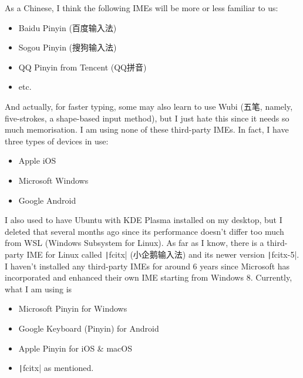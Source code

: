 \documentclass[12pt]{article}
\begin{document}
As a Chinese, I think the following IMEs will be more or less familiar to us:

\begin{itemize}
  \item Baidu Pinyin (百度输入法)
  \item Sogou Pinyin (搜狗输入法)
  \item QQ Pinyin from Tencent (QQ拼音)
  \item etc.
\end{itemize}

And actually, for faster typing, some may also learn to use Wubi (五笔, namely, five-strokes, a shape-based input method), but I just hate this since it needs so much memorisation. I am using none of these third-party IMEs. In fact, I have three types of devices in use:

\begin{itemize}
  \item Apple iOS
  \item Microsoft Windows
  \item Google Android
\end{itemize}

I also used to have Ubuntu with KDE Plasma installed on my desktop, but I deleted that several months ago since its performance doesn't differ too much from WSL (Windows Subsystem for Linux). As far as I know, there is a third-party IME for Linux called \texttt|fcitx| (小企鹅输入法) and its newer version \texttt|fcitx-5|. I haven't installed any third-party IMEs for around 6 years since Microsoft has incorporated and enhanced their own IME starting from Windows 8. Currently, what I am using is

\begin{itemize}
  \item Microsoft Pinyin for Windows
  \item Google Keyboard (Pinyin) for Android
  \item Apple Pinyin for iOS \& macOS
  \item \texttt|fcitx| as mentioned.
\end{itemize}
\end{document}
